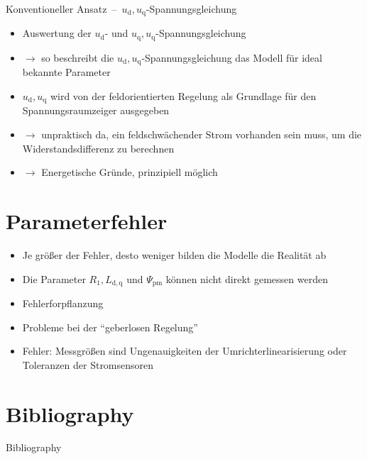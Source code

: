 \documentclass{beamer}
\newcommand{\x}[1]{\mathrm{#1}}
\begin{document}
\begin{frame}{Konventioneller Ansatz~--~$u_\x{d}, u_\x{q}$-Spannungsgleichung}
\begin{itemize}
	\item Auswertung der $u_\x{d}$- und $u_\x{q}, u_\x{q}$-Spannungsgleichung
	\item $\rightarrow$ so beschreibt die $u_\x{d}, u_\x{q}$-Spannungsgleichung das Modell für ideal bekannte Parameter
	\item $u_\x{d}, u_\x{q}$ wird von der feldorientierten Regelung als Grundlage für den Spannungsraumzeiger ausgegeben
\pause	\item $\rightarrow$ unpraktisch da, ein feldschwächender Strom vorhanden sein muss, um die Widerstandsdifferenz zu berechnen \autocite{Kellner2012}
\pause 	\item $\rightarrow$ Energetische Gründe, prinzipiell möglich
\end{itemize}
\end{frame}

\section{Parameterfehler}
\begin{frame}
\begin{itemize}
	\item Je größer der Fehler, desto weniger bilden die Modelle die Realität ab
	\item Die Parameter $R_\x{1}, L_\x{d,q}$ und $\Psi_\x{pm}$ können nicht direkt gemessen werden
	\item Fehlerforpflanzung
	\item Probleme bei der \enquote{geberlosen Regelung}
	\item Fehler: Messgrößen sind Ungenauigkeiten der Umrichterlinearisierung oder Toleranzen der Stromsensoren
\end{itemize}
\end{frame}

\section*{Bibliography}
\begin{frame}[allowframebreaks]{Bibliography}
\printbibliography
\end{frame}

\end{document}
